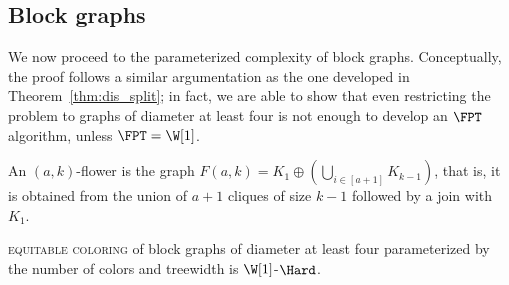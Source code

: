 \subsection{Block graphs}

We now proceed to the parameterized complexity of block graphs.
Conceptually, the proof follows a similar argumentation as the one developed in Theorem~\ref{thm:dis_split}; in fact, we are able to show that even restricting the problem to graphs of diameter at least four is not enough to develop an $\FPT$ algorithm, unless $\FPT = \W[1]$.
 
\begin{definition}
    An $(a,k)$-flower is the graph $F(a,k) = K_1 \oplus \left(\bigcup_{i \in [a+1]} K_{k-1}\right)$, that is, it is obtained from the union of $a+1$ cliques of size $k-1$ followed by a join with $K_1$.
\end{definition}

\begin{theorem}
    \label{thm:blocks}
    \textsc{equitable coloring} of block graphs of diameter at least four parameterized by the number of colors and treewidth is $\W[1]$-$\Hard$. 
\end{theorem}

